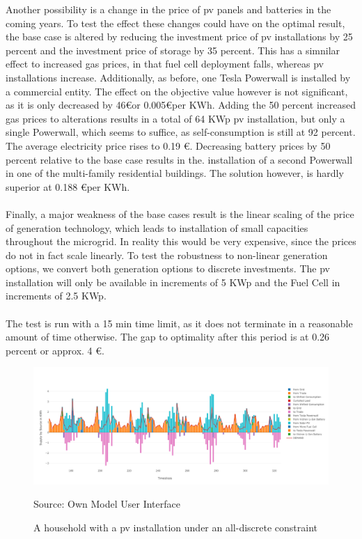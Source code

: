 \documentclass[
	11pt,								%
	DIV10,								%
	a4paper,         					%
	oneside,							%
	headheight=20pt,					%
	footheight=20pt,					%
    parskip=full,						%
    listof=totoc,						%
	bibliography=totoc,					%
	index=totoc,						%
]{scrartcl}
\begin{document}
Another possibility is a change in the price of pv panels and batteries in the coming years. To test the effect these changes could have on the optimal result, the base case is altered by reducing the investment price of pv installations by 25 percent and the investment price of storage by 35 percent. This has a simnilar effect to increased gas prices, in that fuel cell deployment falls, whereas pv installations increase. Additionally, as before, one Tesla Powerwall is installed by a commercial entity. The effect on the objective value however is not significant, as it is only decreased by 46\euro or 0.005\euro per KWh. Adding the 50 percent increased gas prices to alterations results in a total of 64 KWp pv installation, but only a single Powerwall, which seems to suffice, as self-consumption is still at 92 percent. The average electricity price rises to 0.19 \euro. Decreasing battery prices by 50 percent relative to the base case results in the. installation of a second Powerwall in one of the multi-family residential buildings. The solution however, is hardly superior at 0.188 \euro per KWh. 
\\\\
Finally, a major weakness of the base cases result is the linear scaling of the price of generation technology, which leads to installation of small capacities throughout the microgrid. In reality this would be very expensive, since the prices do not in fact scale linearly. To test the robustness to non-linear generation options, we convert both generation options to discrete investments. The pv installation will only be available in increments of 5 KWp and the Fuel Cell in increments of 2.5 KWp.\\\\ 
	The test is run with a 15 min time limit, as it does not terminate in a reasonable amount of time otherwise. The gap to optimality after this period is at 0.26 percent or approx. 4 \euro. 

\begin{figure}[H]
	\centering
	\includegraphics[width=1\textwidth]{pictures/RES_2_DISC.png}
	\caption{A household with a pv installation under an all-discrete constraint}
	\label{commercial_dispatch_base}
	\flushleft\quad\quad\footnotesize{Source: Own Model User Interface}
\end{figure}	
\end{document}

